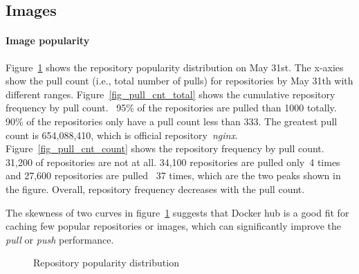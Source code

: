 \subsection{Images}
\label{sec:images}

\paragraph{Image popularity}
%
Figure~\ref{fig-pop} shows the repository popularity distribution on May 31st.
The x-axies show the pull count (i.e., total number of pulls) for repositories
by May 31th with different ranges.  
Figure~\ref{fig_pull_cnt_total} shows the
cumulative repository frequency by pull count. ~95\% of the repositories are
pulled than 1000 totally. 90\% of the repositories only have a pull count less
than 333. The greatest pull count is 654,088,410, which is official
repository~\textit{nginx}.  
Figure~\ref{fig_pull_cnt_count} shows the
repository frequency by pull count. 31,200 of repositories are not at all.
34,100 repositories are pulled only~4 times and 27,600 repositories are pulled
~37 times, which are the two peaks shown in the figure.  Overall, repository
frequency decreases with the pull count.

The skewness of two curves in figure~\ref{fig-pop} suggests that Docker hub is
a good fit for caching few popular repositories or images, which can
significantly improve the \textit{pull} or \textit{push} performance.      

\begin{figure}[!t]
	\centering
	\caption{Repository popularity distribution}
	\label{fig-pop}
\end{figure}

